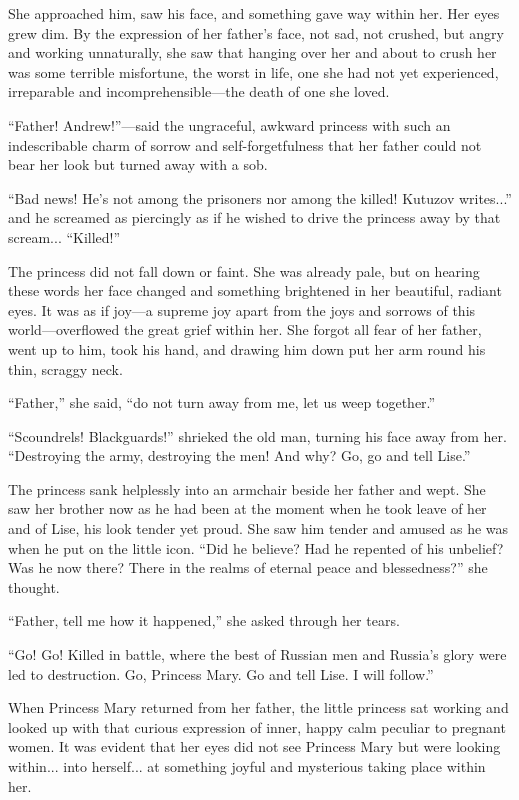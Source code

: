 She approached him, saw his face, and something gave way within
her. Her eyes grew dim. By the expression of her father's face,
not sad, not crushed, but angry and working unnaturally, she saw
that hanging over her and about to crush her was some terrible
misfortune, the worst in life, one she had not yet experienced,
irreparable and incomprehensible---the death of one she loved.

``Father! Andrew!''---said the ungraceful, awkward princess with
such an indescribable charm of sorrow and self-forgetfulness that
her father could not bear her look but turned away with a sob.

``Bad news! He's not among the prisoners nor among the killed!
Kutuzov writes...'' and he screamed as piercingly as if he wished
to drive the princess away by that scream... ``Killed!''

The princess did not fall down or faint. She was already pale,
but on hearing these words her face changed and something
brightened in her beautiful, radiant eyes. It was as if joy---a
supreme joy apart from the joys and sorrows of this
world---overflowed the great grief within her.  She forgot all
fear of her father, went up to him, took his hand, and drawing
him down put her arm round his thin, scraggy neck.

``Father,'' she said, ``do not turn away from me, let us weep
together.''

``Scoundrels! Blackguards!'' shrieked the old man, turning his
face away from her. ``Destroying the army, destroying the men!
And why? Go, go and tell Lise.''

The princess sank helplessly into an armchair beside her father
and wept. She saw her brother now as he had been at the moment
when he took leave of her and of Lise, his look tender yet
proud. She saw him tender and amused as he was when he put on the
little icon. ``Did he believe?  Had he repented of his unbelief?
Was he now there? There in the realms of eternal peace and
blessedness?'' she thought.

``Father, tell me how it happened,'' she asked through her tears.

``Go! Go! Killed in battle, where the best of Russian men and
Russia's glory were led to destruction. Go, Princess Mary. Go and
tell Lise. I will follow.''

When Princess Mary returned from her father, the little princess
sat working and looked up with that curious expression of inner,
happy calm peculiar to pregnant women. It was evident that her
eyes did not see Princess Mary but were looking within... into
herself... at something joyful and mysterious taking place within
her.

